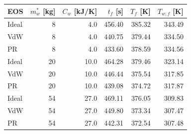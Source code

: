 \begin{tabular}{lrrrrr}
\toprule
EOS & $m_w^*$ [kg] & $C_w$ [kJ/K] & $t_f$ [s] & $T_f$ [K] & $T_{w,f}$ [K] \\
\midrule
Ideal & 8 & 4.0 & 456.40 & 385.32 & 343.49 \\
VdW & 8 & 4.0 & 440.75 & 379.44 & 334.50 \\
PR & 8 & 4.0 & 433.60 & 378.59 & 334.56 \\
Ideal & 20 & 10.0 & 464.28 & 379.46 & 323.14 \\
VdW & 20 & 10.0 & 446.44 & 375.54 & 317.85 \\
PR & 20 & 10.0 & 439.08 & 374.72 & 317.87 \\
Ideal & 54 & 27.0 & 469.11 & 376.05 & 309.83 \\
VdW & 54 & 27.0 & 449.80 & 373.34 & 307.47 \\
PR & 54 & 27.0 & 442.31 & 372.54 & 307.48 \\
\bottomrule
\end{tabular}
